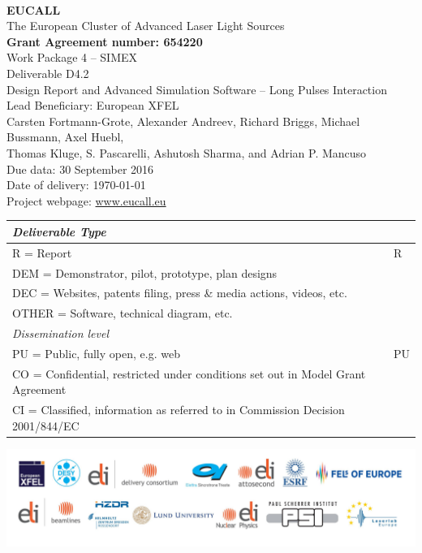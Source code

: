 \documentclass[10pt]{scrartcl}
\begin{document}
\makeatletter
\begin{titlepage}
\thispagestyle{scrheadings}
\begin{center}
$~$\\
\vspace{0cm}
{\Large\textbf{EUCALL}\\[2ex]
The European Cluster of Advanced Laser Light Sources}\\[4ex]
%
{\small\textbf{Grant Agreement number: 654220}}\\[8ex]
%
Work Package 4 -- SIMEX\\[4ex]
%
Deliverable D4.2\\
%
Design Report and Advanced Simulation Software -- Long Pulses
Interaction\\[5ex]
%
Lead Beneficiary: European XFEL\\[5ex]
%
Carsten Fortmann-Grote, Alexander Andreev, Richard Briggs, Michael Bussmann,
  Axel Huebl,\\ Thomas Kluge,
  S. Pascarelli, Ashutosh Sharma, and Adrian P. Mancuso\\[4ex]
%
Due data: 30 September 2016\\
Date of delivery: \today \\[4ex]
%
Project webpage: \url{www.eucall.eu}\\[6ex]
%
{%
\small
\begin{tabular}{|l|l|}
  \hline
  \multicolumn{2}{|l|}{ \textit{Deliverable Type} } \\
  \hline
  R = Report\hfill & R \\
  DEM = Demonstrator, pilot, prototype, plan designs & \\
  DEC = Websites, patents filing, press \& media actions, videos, etc. & \\
  OTHER = Software, technical diagram, etc. & \\
  \hline
  \multicolumn{2}{|l|}{\textit{Dissemination level}} \\
  \hline
  PU = Public, fully open, e.g. web & PU \\
  CO = Confidential, restricted under conditions set out in Model Grant
  Agreement\hspace*{17ex}\  & \\
  CI = Classified, information as referred to in Commission Decision 2001/844/EC
  & \\
  \hline
\end{tabular}
}

\end{center}
%
\vfill
\includegraphics[width=\textwidth]{./PartnerLogos.pdf}
\normalfont
\end{titlepage}
\makeatother
\end{document}
